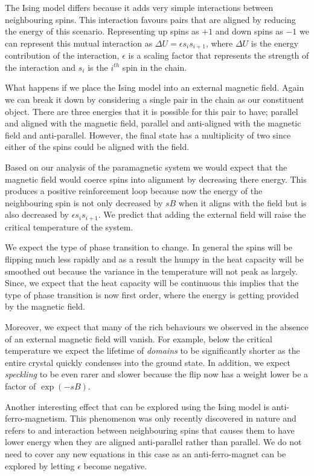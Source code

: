 \documentclass[a4paper, twocolumn]{article}
\begin{document}
The Ising model differs because it adds very simple interactions %
between neighbouring spins. This interaction favours pairs that %
are aligned by reducing the energy of this scenario. Representing %
up spins as \(+1\) and down spins as \(-1\) we can represent this %
mutual interaction as \(\Delta U = \epsilon s_{i}s_{i + 1}\), %
where \(\Delta U\) is the energy contribution of the %
interaction, \(\epsilon\) is a scaling factor that represents %
the strength of the interaction and \(s_{i}\) is the \(i^{th}\) %
spin in the chain. 


What happens if we place the Ising model into an external magnetic %
field. Again we can break it down by considering a single pair %
in the chain as our constituent object. There are three energies %
that it is possible for this pair to have; parallel and aligned %
with the magnetic field, parallel and anti-aligned with the %
magnetic field and anti-parallel. However, the final state has a %
multiplicity of two since either of the spins could be aligned %
with the field. 


Based on our analysis of the paramagnetic system we would expect %
that the magnetic field would coerce spins into alignment by %
decreasing there energy. This produces a positive reinforcement %
loop because now the energy of the neighbouring spin is not %
only decreased by \(sB\) when it aligns with the field but is %
also decreased by \(\epsilon s_{i}s_{i + 1}\). We predict that %
adding the external field will raise the critical temperature of %
the system. 


We expect the type of phase transition to change. In %
general the spins will be flipping much less rapidly and as %
a result the humpy in the heat capacity will be smoothed out %
because the variance in the temperature will not peak as %
largely. Since, we expect that the heat capacity will be %
continuous this implies that the type of phase transition %
is now first order, where the energy is getting provided by the %
magnetic field. 


Moreover, we expect that many of the rich behaviours we observed %
in the absence of an external magnetic field will vanish. For %
example, below the critical temperature we expect the lifetime %
of \emph{domains} to be significantly shorter as the entire %
crystal quickly condenses into the ground state. In addition, %
we expect \emph{speckling} to be even rarer and slower because %
the flip now has a weight lower be a factor of \(\exp(-sB)\). 


Another interesting effect that can be explored using the Ising model %
is anti-ferro-magnetism. This phenomenon was only recently discovered %
in nature and refers to and interaction between neighbouring %
spins that causes them to have lower energy when they are aligned %
anti-parallel rather than parallel. We do not need to cover any new %
equations in this case as an anti-ferro-magnet can be explored by %
letting \(\epsilon\) become negative. 
\end{document}
